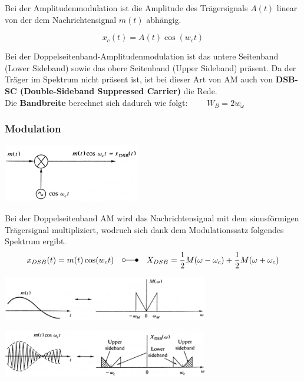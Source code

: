 Bei der Amplitudenmodulation ist die Amplitude des Trägersignals $A(t)$ linear von der dem
Nachrichtensignal $m(t)$ abhängig.

$$ x_c(t) = A(t) \cos(w_c t) $$




Bei der Doppelseitenband-Amplitudenmodulation ist das untere Seitenband (Lower
Sideband) sowie das
obere Seitenband (Upper Sideband) präsent. Da der Träger im Spektrum nicht
präsent ist, ist bei dieser Art von AM auch von \textbf{DSB-SC (Double-Sideband Suppressed Carrier)} die Rede. \\ 
Die \textbf{Bandbreite} berechnet sich dadurch wie folgt: $ \qquad W_B = 2 w_{\omega}$

\subsubsection{Modulation}
\begin{minipage}[c][2.7cm][t]{6.5cm}
    \includegraphics[width=6cm]{bilder/am_dsb_modulation.png}
\end{minipage}
\begin{minipage}[c][2.7cm][t]{11.5cm}
Bei der Doppelseitenband AM wird das Nachrichtensignal mit dem sinusförmigen Trägersignal
multipliziert, wodruch sich dank dem Modulationssatz folgendes Spektrum ergibt. \\
$$ x_{DSB}(t) =
m(t) \cos(w_c t) \quad \laplace \quad X_{DSB} = \frac{1}{2}M(\omega - \omega_c) + \frac{1}{2}M(\omega + \omega_c)$$
\end{minipage}

\begin{minipage}[t]{9.5cm}
    \includegraphics[width=9cm]{bilder/am_dsb_nachrichtensignal.png}
\end{minipage}
\begin{minipage}[t]{9cm}
    \includegraphics[width=9cm]{bilder/am_dsb_spektrum.png}
\end{minipage}

